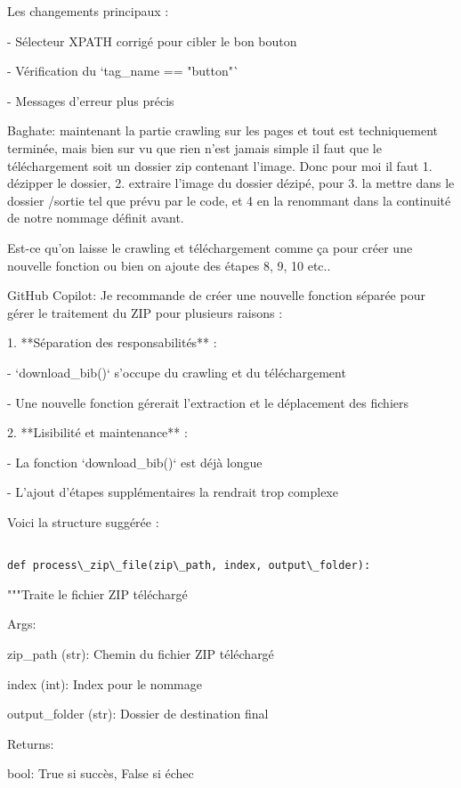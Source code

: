 Les changements principaux :

- Sélecteur XPATH corrigé pour cibler le bon bouton

- Vérification du `tag\_name == "button"`

- Messages d'erreur plus précis

Baghate: maintenant la partie crawling sur les pages et tout est techniquement terminée, mais bien sur vu que rien n'est jamais simple il faut que le téléchargement soit un dossier zip contenant l'image. Donc pour moi il faut 1. dézipper le dossier, 2. extraire l'image du dossier dézipé, pour 3. la mettre dans le dossier /sortie tel que prévu par le code, et 4 en la renommant dans la continuité de notre nommage définit avant.

Est-ce qu'on laisse le crawling et téléchargement comme ça pour créer une nouvelle fonction ou bien on ajoute des étapes 8, 9, 10 etc..

GitHub Copilot: Je recommande de créer une nouvelle fonction séparée pour gérer le traitement du ZIP pour plusieurs raisons :

1. **Séparation des responsabilités** :

- `download\_bib()` s'occupe du crawling et du téléchargement

- Une nouvelle fonction gérerait l'extraction et le déplacement des fichiers

2. **Lisibilité et maintenance** :

- La fonction `download\_bib()` est déjà longue

- L'ajout d'étapes supplémentaires la rendrait trop complexe

Voici la structure suggérée :

\begin{verbatim}

def process\_zip\_file(zip\_path, index, output\_folder):

\end{verbatim}

"""Traite le fichier ZIP téléchargé

Args:

zip\_path (str): Chemin du fichier ZIP téléchargé

index (int): Index pour le nommage

output\_folder (str): Dossier de destination final

Returns:

bool: True si succès, False si échec

